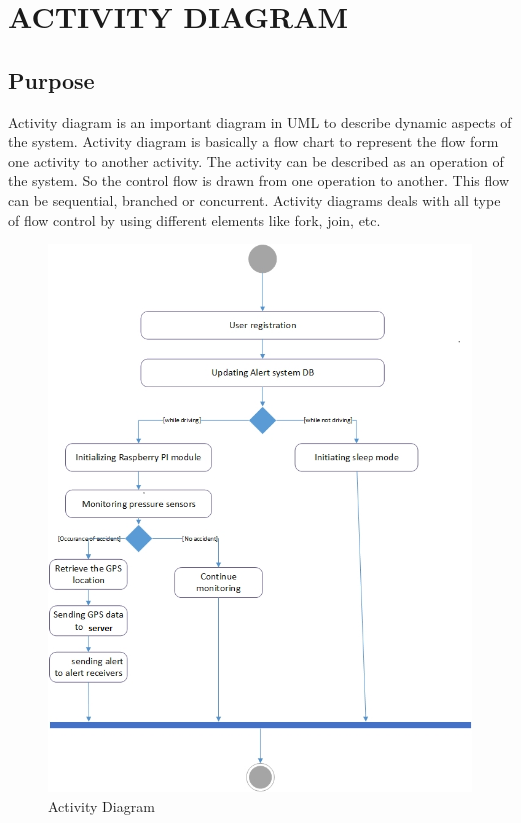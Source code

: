 \documentclass[12pt,a4paper,oneside]{report}
\begin{document}
{\newpage
\section{ACTIVITY DIAGRAM}
\subsection{Purpose}
\par Activity diagram is an important diagram in UML to describe dynamic aspects of the system. Activity diagram is basically a ﬂow chart to represent the ﬂow form one activity to another activity. The activity can be described as an operation of the system. So the control ﬂow is drawn from one operation to another. This ﬂow can be sequential, branched or concurrent. Activity diagrams deals with all type of ﬂow control by using different elements like fork, join, etc.

\newpage
\begin{figure}
\begin{center}
\includegraphics[scale=.5]{activitymod.png}
\caption{  Activity Diagram }
\label{  Activity  Diagram}
\end{center}
\end{figure}
}
\end{document}
